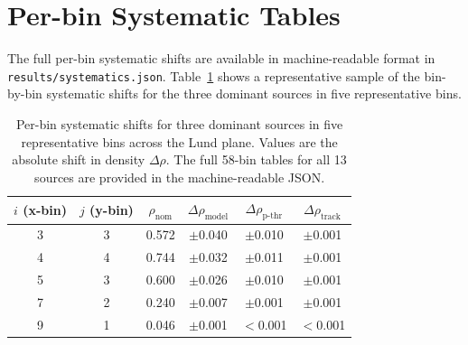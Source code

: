 \documentclass[11pt,a4paper]{article}
\begin{document}
\clearpage


\clearpage
\appendix

\section{Per-bin Systematic Tables}
\label{app:syst-tables}

The full per-bin systematic shifts are available in machine-readable
format in \texttt{results/systematics.json}.
Table~\ref{tbl:syst-perbin-sample} shows a representative sample of
the bin-by-bin systematic shifts for the three dominant sources in
five representative bins.

\begin{table}[htbp]
\centering
\caption{Per-bin systematic shifts for three dominant sources in five
  representative bins across the Lund plane.  Values are the absolute
  shift in density $\Delta\rho$.  The full 58-bin tables for all 13
  sources are provided in the machine-readable JSON.}
\label{tbl:syst-perbin-sample}
\begin{tabular}{cccccc}
\toprule
$i$ (x-bin) & $j$ (y-bin) & $\rho_\text{nom}$ &
  $\Delta\rho_\text{model}$ & $\Delta\rho_\text{p-thr}$ &
  $\Delta\rho_\text{track}$ \\
\midrule
3 & 3 & 0.572 & $\pm$0.040 & $\pm$0.010 & $\pm$0.001 \\
4 & 4 & 0.744 & $\pm$0.032 & $\pm$0.011 & $\pm$0.001 \\
5 & 3 & 0.600 & $\pm$0.026 & $\pm$0.010 & $\pm$0.001 \\
7 & 2 & 0.240 & $\pm$0.007 & $\pm$0.001 & $\pm$0.001 \\
9 & 1 & 0.046 & $\pm$0.001 & $<$0.001 & $<$0.001 \\
\bottomrule
\end{tabular}
\end{table}

\end{document}
